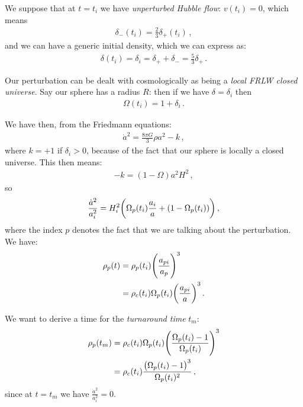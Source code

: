 \documentclass[main.tex]{subfiles}
\begin{document}
We suppose that at \(t=t_i\) we have \emph{unperturbed Hubble flow}: \(v(t_i) = 0\), which means 
%
\begin{align}
\delta_{-} (t_i) = \frac{2}{3} \delta_{+}(t_i)
\,,
\end{align}
%
and we can have a generic initial density, which we can express as: 
%
\begin{align}
\delta (t_i) = \delta_{i} = \delta_{+} + \delta_{-} = \frac{5}{3} \delta_{+} 
\,.
\end{align}

Our perturbation can be dealt with cosmologically as being a \emph{local FRLW closed universe}. 
Say our sphere has a radius \(R\): then if we have \( \delta = \delta_i\) then 
%
\begin{align}
\Omega (t_i) = 1 + \delta_{i}
\,.
\end{align}

We have then, from the Friedmann equations: 
%
\begin{align}
\dot{a}^2 = \frac{8 \pi G}{3} \rho a^2 - k 
\,,
\end{align}
%
where \(k = +1\) if \(\delta_{i} > 0\), because of the fact that our sphere is locally a closed universe. 
This then means: 
%
\begin{align}
- k = (1 - \Omega ) a^2 H^2
\,,
\end{align}
%
so 
%
\begin{align}
\frac{\dot{a}^2 }{a_i^2} = H_i^2 \qty(
    \Omega_{p} (t_i) \frac{a_i}{a} + (1 - \Omega_{p}(t_i))
)
\,,
\end{align}
%
where the index \(p\) denotes the fact that we are talking about the perturbation. We have: 
%
\begin{subequations}
\begin{align}
\rho_{p} (t) &= \rho_{p}(t_i) \qty(\frac{a_{pi}}{a_p})^3  \\
&= \rho_{c} (t_i) \Omega_{p} (t_i) \qty(\frac{a_{pi}}{a})^3
\,.
\end{align}
\end{subequations}

We want to derive a time for the \emph{turnaround time} \(t_m\): 
%
\begin{subequations}
\begin{align}
\rho_{p} (t_m) &= \rho_{c} (t_i) \Omega_{p}(t_i) \qty(\frac{\Omega_{p}(t_i) - 1}{\Omega_{p} (t_i)})^3  \\
&= \rho_{c}(t_i) \frac{\qty(\Omega_{p}(t_i) - 1)^3}{\Omega_{p}(t_i)^2}
\,,
\end{align}
\end{subequations}
%
since at \(t = t_m\) we have \(\frac{\dot{a}^2}{a_{i}^2} = 0\). 
\end{document}
